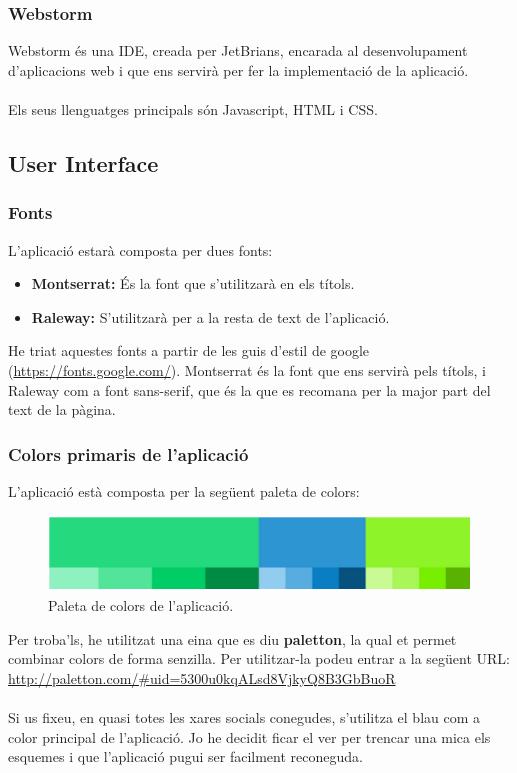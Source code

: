 \documentclass[11pt,catalan,listoffigures,listoftables]{tfgetsinf}
\begin{document}
\subsubsection{Webstorm}

Webstorm és una IDE, creada per JetBrians, encarada al desenvolupament d'aplicacions web i que ens servirà per fer la implementació de la aplicació.\\ \\
Els seus llenguatges principals són Javascript, HTML i CSS.

\subsection{User Interface}

\subsubsection{Fonts}

L'aplicació estarà composta per dues fonts:
\begin{itemize}
\item \textbf{Montserrat:} És la font que s'utilitzarà en els títols.
\item \textbf{Raleway:} S'utilitzarà per a la resta de text de l'aplicació.
\end{itemize}
He triat aquestes fonts a partir de les guis d'estil de google (\url{https://fonts.google.com/}). Montserrat és la font que ens servirà pels títols, i Raleway com a font sans-serif, que és la que es recomana per la major part del text de la pàgina.

\subsubsection{Colors primaris de l'aplicació}

L'aplicació està composta per la següent paleta de colors:

\begin{figure}[h]
\includegraphics[width=12cm]{images/image1}
\centering
\caption[]{Paleta de colors de l'aplicació.}
\centering
\end{figure}
Per troba'ls, he utilitzat una eina que es diu \textbf{paletton}, la qual et permet combinar colors de forma senzilla. Per utilitzar-la podeu entrar a la següent URL:\\
\url{http://paletton.com/\#uid=5300u0kqALsd8VjkyQ8B3GbBuoR} \\ \\
Si us fixeu, en quasi totes les xares socials conegudes, s'utilitza el blau com a color principal de l'aplicació. Jo he decidit ficar el ver per trencar una mica els esquemes i que l'aplicació pugui ser facilment reconeguda.
\end{document}
